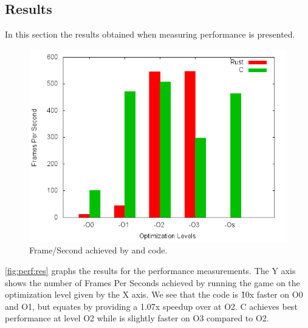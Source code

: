 \subsection{Results}
\label{sec:perf:res}

In this section the results obtained when measuring performance is presented.

\begin{figure}[H]
  \begin{center}
    \includegraphics[scale=0.5]{results/plots/perf/perf.png}
  \end{center}
  \caption{Frame/Second achieved by {\C} and {\rust} code.}
  \label{fig:perf:res}
\end{figure}

\autoref{fig:perf:res} graphs the results for the performance measurements.
The Y axis shows the number of Frames Per Seconds achieved by running the game on the optimization level given by the X axis.
We see that the {\C} code is \~10x faster on O0 and O1, but {\rust} equates by providing a 1.07x speedup over {\C} at O2.
C achieves best performance at level O2 while {\rust} is slightly faster on O3 compared to O2.

